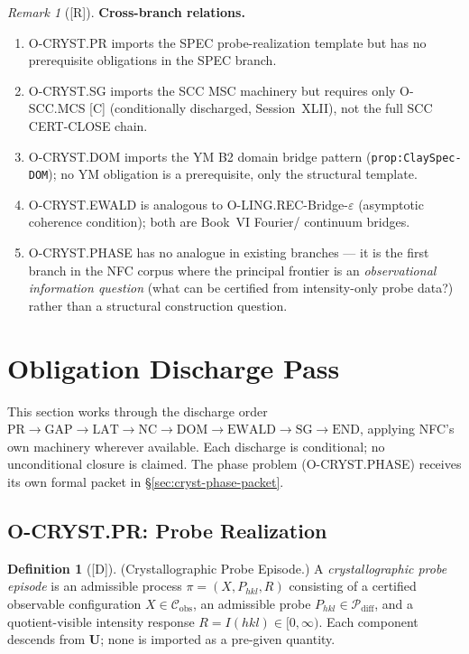 \documentclass[12pt,oneside]{amsbook}
\theoremstyle{plain}
\theoremstyle{definition}
\newtheorem{definition}[theorem]{Definition}
\theoremstyle{remark}
\newtheorem{remark}[theorem]{Remark}
\newcommand{\status}[1]{\textup{[#1]}}
\begin{document}
\begin{remark}[\status{R}]
\medskip
\textbf{Cross-branch relations.}
\begin{enumerate}[label=\textup{(\arabic*)}]
  \item O-CRYST.PR imports the SPEC probe-realization template
    but has no prerequisite obligations in the SPEC branch.
  \item O-CRYST.SG imports the SCC MSC machinery but requires
    only O-SCC.MCS [C] (conditionally discharged, Session~XLII),
    not the full SCC CERT-CLOSE chain.
  \item O-CRYST.DOM imports the YM B2 domain bridge pattern
    (\texttt{prop:ClaySpec-DOM}); no YM obligation is a
    prerequisite, only the structural template.
  \item O-CRYST.EWALD is analogous to O-LING.REC-Bridge-$\varepsilon$
    (asymptotic coherence condition); both are Book~VI Fourier/
    continuum bridges.
  \item O-CRYST.PHASE has no analogue in existing branches ---
    it is the first branch in the NFC corpus where the principal
    frontier is an \emph{observational information question} (what
    can be certified from intensity-only probe data?) rather than
    a structural construction question.
\end{enumerate}
\end{remark}

\section{Obligation Discharge Pass}
\label{sec:cryst-discharges}

This section works through the discharge order
$\mathrm{PR} \to \mathrm{GAP} \to \mathrm{LAT} \to \mathrm{NC}
\to \mathrm{DOM} \to \mathrm{EWALD} \to \mathrm{SG} \to \mathrm{END}$,
applying NFC's own machinery wherever available.  Each discharge is
conditional; no unconditional closure is claimed.  The phase problem
(O-CRYST.PHASE) receives its own formal packet in
§\ref{sec:cryst-phase-packet}.

\subsection{O-CRYST.PR: Probe Realization}
\label{sec:cryst-PR-discharge}

\begin{definition}[\status{D}]\label{def:cryst-probe-episode}
\textup{(Crystallographic Probe Episode.)}
A \emph{crystallographic probe episode} is an admissible process
$\pi = (X, P_{hkl}, R)$ consisting of a certified observable
configuration $X \in \mathcal{C}_{\mathrm{obs}}$, an admissible
probe $P_{hkl} \in \mathcal{P}_{\mathrm{diff}}$, and a
quotient-visible intensity response $R = I(hkl) \in [0,\infty)$.
Each component descends from $\mathbf{U}$; none is imported as a
pre-given quantity.
\end{definition}
\end{document}
